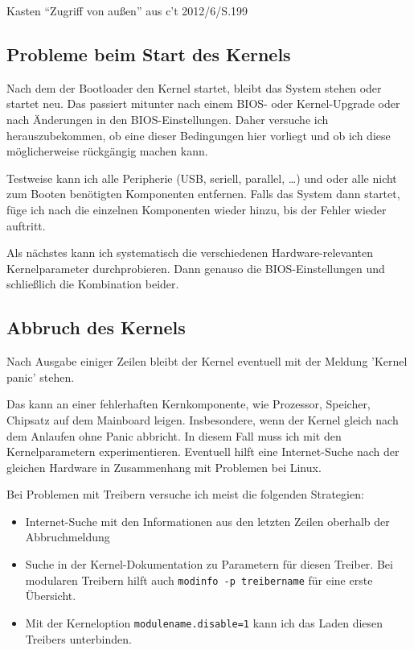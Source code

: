 \begin{notes}
\item Kasten ``Zugriff von außen'' aus c't 2012/6/S.199
\end{notes}

\subsection{Probleme beim Start des Kernels}

Nach dem der Bootloader den Kernel startet, bleibt das System stehen oder
startet neu. Das passiert mitunter nach einem BIOS- oder Kernel-Upgrade oder
nach Änderungen in den BIOS-Einstellungen. Daher versuche ich
herauszubekommen, ob eine dieser Bedingungen hier vorliegt und ob ich diese
möglicherweise rückgängig machen kann.

Testweise kann ich alle Peripherie (USB, seriell, parallel, \ldots) und oder
alle nicht zum Booten benötigten Komponenten entfernen. Falls das System dann
startet, füge ich nach die einzelnen Komponenten wieder hinzu, bis der Fehler
wieder auftritt.

Als nächstes kann ich systematisch die verschiedenen Hardware-relevanten
Kernelparameter durchprobieren. Dann genauso die BIOS-Einstellungen und
schließlich die Kombination beider.

\subsection{Abbruch des Kernels}

Nach Ausgabe einiger Zeilen bleibt der Kernel eventuell mit der Meldung
'Kernel panic' stehen.

Das kann an einer fehlerhaften Kernkomponente, wie Prozessor, Speicher,
Chipsatz auf dem Mainboard leigen. Insbesondere, wenn der Kernel gleich nach
dem Anlaufen ohne Panic abbricht. In diesem Fall muss ich mit den
Kernelparametern experimentieren. Eventuell hilft eine Internet-Suche nach der
gleichen Hardware in Zusammenhang mit Problemen bei Linux.

Bei Problemen mit Treibern versuche ich meist die folgenden Strategien:
\begin{itemize}
  \item Internet-Suche mit den Informationen aus den letzten Zeilen oberhalb
    der Abbruchmeldung
  \item Suche in der Kernel-Dokumentation zu Parametern für diesen Treiber.
    Bei modularen Treibern hilft auch \verb?modinfo -p treibername? für eine
    erste Übersicht.
  \item Mit der Kerneloption \verb?modulename.disable=1? kann ich das Laden
    diesen Treibers unterbinden.
\end{itemize}

